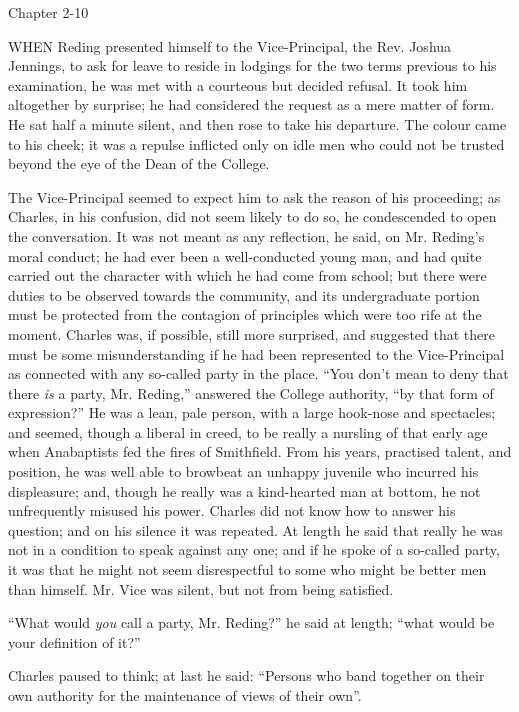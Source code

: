 Chapter 2-10


WHEN Reding presented himself to the
Vice-Principal, the Rev. Joshua Jennings, to ask for leave to reside
in lodgings for the two terms previous to his examination, he was met
with a courteous but decided refusal. It took him altogether by
surprise; he had considered the request as a mere matter of form. He
sat half a minute silent, and then rose to take his departure. The
colour came to his cheek; it was a repulse inflicted only on idle men
who could not be trusted beyond the eye of the Dean of the College.

The Vice-Principal seemed to expect him to ask the reason of his
proceeding; as Charles, in his confusion, did not seem likely to do
so, he condescended to open the conversation. It was not meant as any
reflection, he said, on Mr. Reding's moral conduct; he had ever been a
well-conducted young man, and had quite carried out the character with
which he had come from school; but there were duties to be observed
towards the community, and its undergraduate portion must be protected
from the contagion of principles which were too rife at the moment.
Charles was, if possible, still more surprised, and suggested that
there must be some misunderstanding if he had been represented
to the Vice-Principal as connected with any so-called party in the
place. ``You don't mean to deny that there \emph{is} a party, Mr.
Reding,'' answered the College authority, ``by that form of
expression?'' He was a lean, pale person, with a large hook-nose
and spectacles; and seemed, though a liberal in creed, to be really a
nursling of that early age when Anabaptists fed the fires of
Smithfield. From his years, practised talent, and position, he was
well able to browbeat an unhappy juvenile who incurred his
displeasure; and, though he really was a kind-hearted man at bottom,
he not unfrequently misused his power. Charles did not know how to
answer his question; and on his silence it was repeated. At length he
said that really he was not in a condition to speak against any one;
and if he spoke of a so-called party, it was that he might not seem
disrespectful to some who might be better men than himself. Mr. Vice
was silent, but not from being satisfied.

``What would \emph{you} call a party, Mr. Reding?'' he said
at length; ``what would be your definition of it?''

Charles paused to think; at last he said: ``Persons who band
together on their own authority for the maintenance of views of their
own''.


